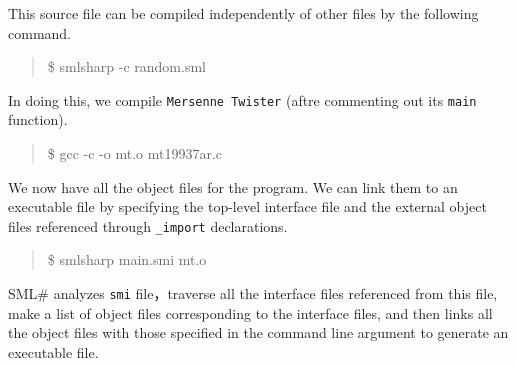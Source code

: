 \documentclass{jbook}
\newcommand{\smlsharp}{SML\#}
\newenvironment{program}{\begin{quote}\begin{tt}}%
                        {\end{tt}\end{quote}}
\begin{document}
	This source file can be compiled independently of other files
by the following command.
\begin{program}
\$ smlsharp -c random.sml
\end{program}
	In doing this, we compile {\tt Mersenne Twister} (aftre
commenting out its {\tt main} function).
\begin{program}
\$ gcc -c -o mt.o mt19937ar.c
\end{program}
	We now have all the object files for the program.
	We can link them to an executable file by specifying the
top-level interface file and the external object files referenced
through {\tt \_import} declarations.
\begin{program}
\$ smlsharp main.smi mt.o
\end{program}
	\smlsharp{} analyzes {\tt smi} file，traverse all the interface
files referenced from this file, make a list of object files
corresponding to the interface files, and then links all the object
files with those specified in the command line argument to generate an
executable file.
	
\end{document}

